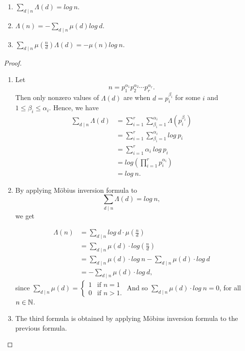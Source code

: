 \begin{theorem}
    \begin{enumerate}
        \item $\sum_{d \mid n} \Lambda(d) = log \ n$.
        \item $\Lambda(n) = -\sum_{d \mid n} \mu(d) log \ d$.
        \item $\sum_{d \mid n} \mu(\frac{n}{d}) \Lambda(d) = - \mu(n) log \ n$.
    \end{enumerate}
\end{theorem}
\begin{proof}
    \begin{enumerate}
        \item Let \[n = p_1^{\alpha_1} p_2^{\alpha_2} \cdots p_r^{\alpha_r}.\]
        Then only nonzero values of $\Lambda(d)$ are when $d = p_i^{\beta_i}$ for some $i$ and $1 \le \beta_i \le \alpha_i$. Hence, we have 
        \begin{align*}
        \sum_{d \mid n} \Lambda(d)
        &= \sum_{i=1}^r \sum_{\beta_i=1}^{\alpha_i} \Lambda(p_i^{\beta_i})\\
        &= \sum_{i=1}^r \sum_{\beta_i=1}^{\alpha_i} log \ p_i\\
        &= \sum_{i=1}^r \alpha_i \ log \ p_i\\
        &= log \left(\prod_{i=1}^{r} p_i^{\alpha_i}\right)\\
        &= log \ n.
        \end{align*}

        \item By applying Möbius inversion formula to \[\sum_{d \mid n} \Lambda(d) = log \ n,\] we get
        
        \begin{align*}
            \Lambda(n) &= \sum_{d \mid n} log \ d \cdot \mu\left(\frac{n}{d}\right)\\
            &= \sum_{d \mid n} \mu(d) \cdot log\left(\frac{n}{d}\right)\\
            &= \sum_{d \mid n}  \mu(d) \cdot log \ n - \sum_{d \mid n} \mu(d) \cdot log \ d\\
            &= - \sum_{d \mid n}  \mu(d) \cdot log \ d,
        \end{align*}
        since $\sum_{d \mid n} \mu(d) = \begin{cases}
            1 & \text{if } n = 1\\
            0 & \text{if } n > 1.
        \end{cases}$ And so $\sum_{d \mid n} \mu(d) \cdot log \ n = 0$, for all $n \in \mathbb{N}$.

        \item The third formula is obtained by applying Möbius inversion formula to the previous formula.
    \end{enumerate}
\end{proof}